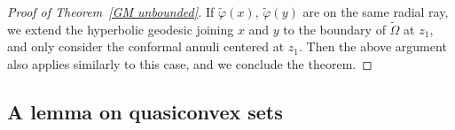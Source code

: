\documentclass[reqno,11pt]{amsart}
\makeatletter
\def\wz{\widetilde}
\numberwithin{equation}{section}
\theoremstyle{remark}
\newtheorem{rem}[thm]{Remark}%
\makeatother
\begin{document}
\begin{proof}[Proof of Theorem~\ref{GM unbounded}]
If  $\wz \varphi(x),\,\wz \varphi(y)$ are on the same radial ray, we extend the hyperbolic geodesic joining $x$ and $y$ to the boundary of $\wz \Omega$ at $z_1$, and only consider the conformal annuli centered at $z_1$. Then the above argument also applies similarly to this case, and we conclude the theorem. 
\end{proof}
 





\subsection{A lemma on quasiconvex sets}\label{appendix quasiconvex} 
\end{document}
